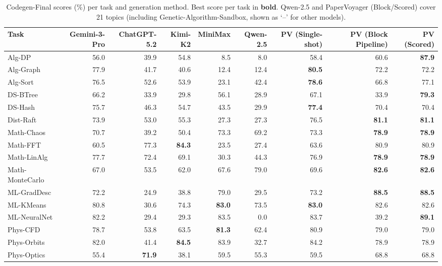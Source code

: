 \begin{table}[t]
  \centering
  \small
  \caption{Codegen-Final scores (\%) per task and generation method. Best score per task in \textbf{bold}. Qwen-2.5 and PaperVoyager (Block/Scored) cover 21 topics (including Genetic-Algorithm-Sandbox, shown as `--' for other models).}
  \label{tab:main_results}
  \setlength{\tabcolsep}{4pt}
  \begin{tabular}{lrrrrrrrr}
    \toprule
    Task & Gemini-3-Pro & ChatGPT-5.2 & Kimi-K2 & MiniMax & Qwen-2.5 & PV (Single-shot) & PV (Block Pipeline) & PV (Scored) \\
    \midrule
    Alg-DP & 56.0 & 39.9 & 54.8 & 8.5 & 8.0 & 58.4 & 60.6 & \textbf{87.9} \\
    Alg-Graph & 77.9 & 41.7 & 40.6 & 12.4 & 12.4 & \textbf{80.5} & 72.2 & 72.2 \\
    Alg-Sort & 76.5 & 52.6 & 53.9 & 23.1 & 42.4 & \textbf{78.6} & 66.8 & 77.1 \\
    DS-BTree & 66.2 & 33.9 & 29.8 & 56.1 & 28.9 & 67.1 & 33.9 & \textbf{79.3} \\
    DS-Hash & 75.7 & 46.3 & 54.7 & 43.5 & 29.9 & \textbf{77.4} & 70.4 & 70.4 \\
    Dist-Raft & 73.9 & 53.0 & 55.3 & 27.3 & 27.3 & 76.5 & \textbf{81.1} & \textbf{81.1} \\
    Math-Chaos & 70.7 & 39.2 & 50.4 & 73.3 & 69.2 & 73.3 & \textbf{78.9} & \textbf{78.9} \\
    Math-FFT & 60.5 & 77.3 & \textbf{84.3} & 23.5 & 27.4 & 63.6 & 80.9 & 80.9 \\
    Math-LinAlg & 77.7 & 72.4 & 69.1 & 30.3 & 44.3 & 76.9 & \textbf{78.9} & \textbf{78.9} \\
    Math-MonteCarlo & 67.0 & 53.5 & 62.0 & 67.6 & 79.0 & 69.6 & \textbf{82.6} & \textbf{82.6} \\
    ML-GradDesc & 72.2 & 24.9 & 38.8 & 79.0 & 29.5 & 73.2 & \textbf{88.5} & \textbf{88.5} \\
    ML-KMeans & 80.8 & 30.6 & 74.3 & \textbf{83.0} & 73.5 & \textbf{83.0} & 82.6 & 82.6 \\
    ML-NeuralNet & 82.2 & 29.4 & 29.3 & 83.5 & 0.0 & 83.7 & 39.2 & \textbf{89.1} \\
    Phys-CFD & 78.7 & 53.8 & 63.5 & \textbf{81.3} & 62.4 & 80.9 & 79.0 & 79.0 \\
    Phys-Orbits & 82.0 & 41.4 & \textbf{84.5} & 83.9 & 32.7 & 84.2 & 78.9 & 78.9 \\
    Phys-Optics & 55.4 & \textbf{71.9} & 38.1 & 59.5 & 55.3 & 59.5 & 68.8 & 68.8 \\

\end{tabular}
\end{table}
